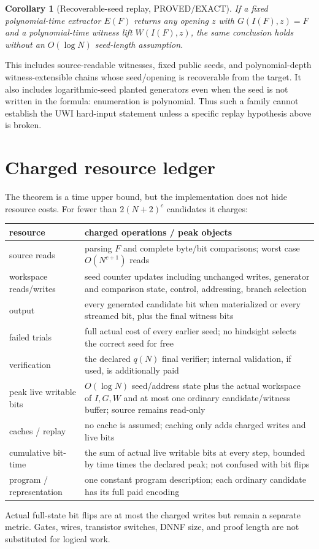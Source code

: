 \documentclass[11pt]{article}
\newtheorem{corollary}[theorem]{Corollary}
\begin{document}
\begin{corollary}[Recoverable-seed replay, PROVED/EXACT]
If a fixed polynomial-time extractor $E(F)$ returns any opening $z$ with
$G(I(F),z)=F$ and a polynomial-time witness lift $W(I(F),z)$, the same conclusion
holds without an $O(\log N)$ seed-length assumption.
\end{corollary}

This includes source-readable witnesses, fixed public seeds, and polynomial-depth
witness-extensible chains whose seed/opening is recoverable from the target.  It
also includes logarithmic-seed planted generators even when the seed is not written
in the formula: enumeration is polynomial.  Thus such a family cannot establish
the UWI hard-input statement unless a specific replay hypothesis above is broken.

\section{Charged resource ledger}
The theorem is a time upper bound, but the implementation does not hide resource
costs.  For fewer than $2(N+2)^c$ candidates it charges:
\begin{center}\small
\begin{tabularx}{.98\linewidth}{@{}lX@{}}
\toprule
resource & charged operations / peak objects \\
\midrule
source reads & parsing $F$ and complete byte/bit comparisons; worst case
$O(N^{c+1})$ reads \\
workspace reads/writes & seed counter updates including unchanged writes,
generator and comparison state, control, addressing, branch selection \\
output & every generated candidate bit when materialized or every streamed bit,
plus the final witness bits \\
failed trials & full actual cost of every earlier seed; no hindsight selects the
correct seed for free \\
verification & the declared $q(N)$ final verifier; internal validation, if used,
is additionally paid \\
peak live writable bits & $O(\log N)$ seed/address state plus the actual workspace
of $I,G,W$ and at most one ordinary candidate/witness buffer; source remains
read-only \\
caches / replay & no cache is assumed; caching only adds charged writes and live bits \\
cumulative bit-time & the sum of actual live writable bits at every step, bounded
by time times the declared peak; not confused with bit flips \\
program / representation & one constant program description; each ordinary
candidate has its full paid encoding \\
\bottomrule
\end{tabularx}
\end{center}
Actual full-state bit flips are at most the charged writes but remain a separate
metric.  Gates, wires, transistor switches, DNNF size, and proof length are not
substituted for logical work.
\end{document}
